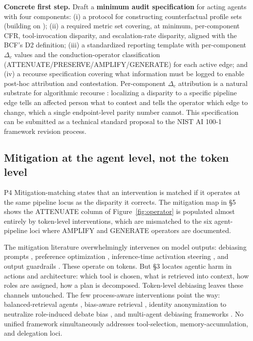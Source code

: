 \documentclass[acmsmall,nonacm]{acmart}
\begin{document}
\textbf{Concrete first step.} Draft a \textbf{minimum audit specification} for acting agents with four components: (i) a protocol for constructing counterfactual profile sets (building on \cite{parziale2025systematic}); (ii) a required metric set covering, at minimum, per-component CFR, tool-invocation disparity, and escalation-rate disparity, aligned with the BCF's D2 definition; (iii) a standardized reporting template with per-component $\Delta_c$ values and the conduction-operator classification (ATTENUATE/PRESERVE/AMPLIFY/GENERATE) for each active edge; and (iv) a recourse specification covering what information must be logged to enable post-hoc attribution and contestation. Per-component $\Delta_c$ attribution is a natural substrate for algorithmic recourse \cite{karimi2022recourse}: localizing a disparity to a specific pipeline edge tells an affected person what to contest and tells the operator which edge to change, which a single endpoint-level parity number cannot. This specification can be submitted as a technical standard proposal to the NIST AI 100-1 framework revision process.

\subsection{Mitigation at the agent level, not the token level}

P4 Mitigation-matching states that an intervention is matched if it operates at the same pipeline locus as the disparity it corrects. The mitigation map in \S{}5 shows the ATTENUATE column of Figure~\ref{fig:operator} is populated almost entirely by token-level interventions, which are mismatched to the six agent-pipeline loci where AMPLIFY and GENERATE operators are documented.

The mitigation literature overwhelmingly intervenes on model outputs: debiasing prompts \cite{furniturewala2024thinking,li2024prompting}, preference optimization \cite{allam2024biasdpo,bai2022constitutional}, inference-time activation steering \cite{li2025fairsteer}, and output guardrails \cite{dong2024building}. These operate on tokens. But \S{}3 locates agentic harm in actions and architecture: which tool is chosen, what is retrieved into context, how roles are assigned, how a plan is decomposed. Token-level debiasing leaves these channels untouched. The few process-aware interventions point the way: balanced-retrieval agents \cite{singh2025biasb}, bias-aware retrieval \cite{singh2025bias}, identity anonymization to neutralize role-induced debate bias \cite{choi2025identity}, and multi-agent debiasing frameworks \cite{owens2024multi,xu2024mitigating}. No unified framework simultaneously addresses tool-selection, memory-accumulation, and delegation loci.
\end{document}
